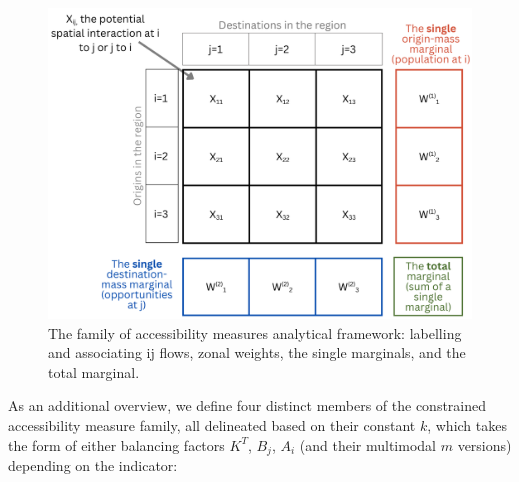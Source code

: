 \documentclass[
11pt, %
oneside, %
english, %
singlespacing, %
]{macthesis} %
\begin{document}
\begin{figure}
\includegraphics[width=0.7\linewidth]{data/figures/chp2-access-analytical-device} \caption{The family of accessibility measures analytical framework: labelling and associating ij flows, zonal weights, the single marginals, and the total marginal.}\label{fig:chp2-fig-analytical-device-conc-accessibility}
\end{figure}

As an additional overview, we define four distinct members of the constrained accessibility measure family, all delineated based on their constant \(k\), which takes the form of either balancing factors \(K^T\), \(B_j\), \(A_i\) (and their multimodal \(m\) versions) depending on the indicator:
\end{document}
